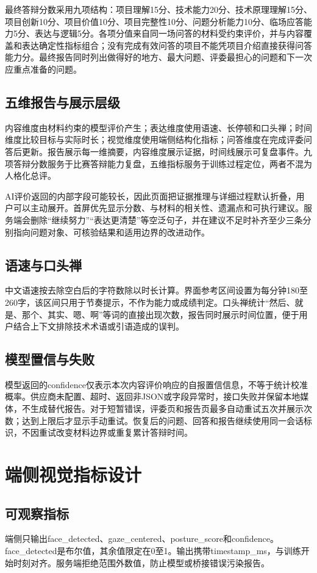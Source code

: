 最终答辩分数采用九项结构：项目理解15分、技术能力20分、技术原理理解15分、项目创新10分、项目价值10分、项目完整性10分、问题分析能力10分、临场应答能力5分、表达与逻辑5分。各项分值来自同一场问答的材料受约束评价，并与内容覆盖和表达确定性指标组合；没有完成有效问答的项目不能凭项目介绍直接获得问答能力分。最终报告同时列出做得好的地方、最大问题、评委最担心的问题和下一次应重点准备的问题。

\section{五维报告与展示层级}
内容维度由材料约束的模型评价产生；表达维度使用语速、长停顿和口头禅；时间维度比较目标与实际时长；视觉维度使用端侧结构化指标；问答维度在完成评委问答后更新。报告展示每一维摘要，内容维度展示证据，时间线展示可复盘事件。九项答辩分数服务于比赛答辩能力复盘，五维指标服务于训练过程定位，两者不混为人格化总评。

AI评价返回的内部字段可能较长，因此页面把证据推理与详细过程默认折叠，用户可以主动展开。首屏优先显示分数、与材料的相关性、遗漏点和可执行建议。服务端会删除“继续努力”“表达更清楚”等空泛句子，并在建议不足时补齐至少三条分别指向问题对象、可核验结果和适用边界的改进动作。

\section{语速与口头禅}
中文语速按去除空白后的字符数除以时长计算。界面参考区间设置为每分钟180至260字，该区间只用于节奏提示，不作为能力或成绩判定。口头禅统计“然后、就是、那个、其实、嗯、啊”等词的直接出现次数，报告同时展示时间位置，便于用户结合上下文排除技术术语或引语造成的误判。

\section{模型置信与失败}
模型返回的confidence仅表示本次内容评价响应的自报置信信息，不等于统计校准概率。供应商未配置、超时、返回非JSON或字段异常时，接口失败并保留本地媒体，不生成替代报告。对于短暂错误，评委页和报告页最多自动重试五次并展示次数；达到上限后才显示手动重试。恢复后的问题、回答和报告继续使用同一会话标识，不因重试改变材料边界或重复累计答辩时间。

\chapter{端侧视觉指标设计}
\section{可观察指标}
端侧只输出face\_detected、gaze\_centered、posture\_score和confidence。face\_detected是布尔值，其余值限定在0至1。输出携带timestamp\_ms，与训练开始时刻对齐。服务端拒绝范围外数值，防止模型或桥接错误污染报告。


